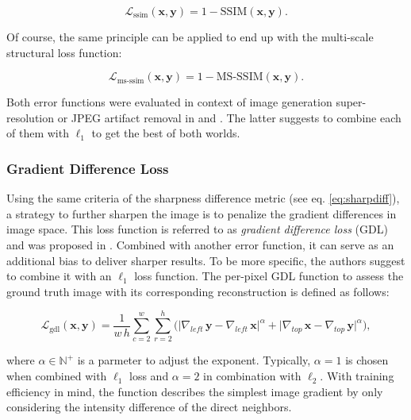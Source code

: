 \begin{equation} \label{eq:ssim}
\mathcal{L}_{\textrm{ssim}}(\textbf{x}, \textbf{y}) = 1 - \textrm{SSIM}(\textbf{x}, \textbf{y}).
\end{equation}

Of course, the same principle can be applied to end up with the multi-scale structural loss function:

\begin{equation} \label{eq:msssim}
\mathcal{L}_{\textrm{ms-ssim}}(\textbf{x}, \textbf{y}) = 1 - \textrm{MS-SSIM}(\textbf{x}, \textbf{y}).
\end{equation}

Both error functions were evaluated in context of image generation super-resolution or JPEG artifact removal in \parencite{learning-perc-sim} and \parencite{loss-func-img-proc}. The latter suggests to combine each of them with $ \ell_1 $ to get the best of both worlds.

\subsubsection*{Gradient Difference Loss} \label{sec:gdl}

Using the same criteria of the sharpness difference metric (see eq. \ref{eq:sharpdiff}), a strategy to further sharpen the image is to penalize the gradient differences in image space. This loss function is referred to as \textit{gradient difference loss} (GDL) and was proposed in \parencite{deep_multiscale_video_pred}. Combined with another error function, it can serve as an additional bias to deliver sharper results. To be more specific, the authors suggest to combine it with an $ \ell_1 $ loss function. The per-pixel GDL function to assess the ground truth image with its corresponding reconstruction is defined as follows:

\begin{equation} \label{eq:gdl}
\mathcal{L}_{\textrm{gdl}}(\textbf{x}, \textbf{y}) = \frac{1}{w \, h} \sum_{c=2}^{w} \sum_{r=2}^{h} \Big(\big|\nabla_{left} \, \textbf{y} - \nabla_{left} \, \textbf{x}\big|^{\alpha} + \big|\nabla_{top} \, \textbf{x} - \nabla_{top} \, \textbf{y}\big|^{\alpha}\Big) ,
\end{equation}

where $ \alpha \in \mathbb{N}^{+} $ is a parmeter to adjust the exponent. Typically, $ \alpha = 1 $ is chosen when combined with $ \ell_1 $ loss and $ \alpha = 2 $ in combination with $ \ell_2 $. With training efficiency in mind, the function describes the simplest image gradient by only considering the intensity difference of the direct neighbors.
